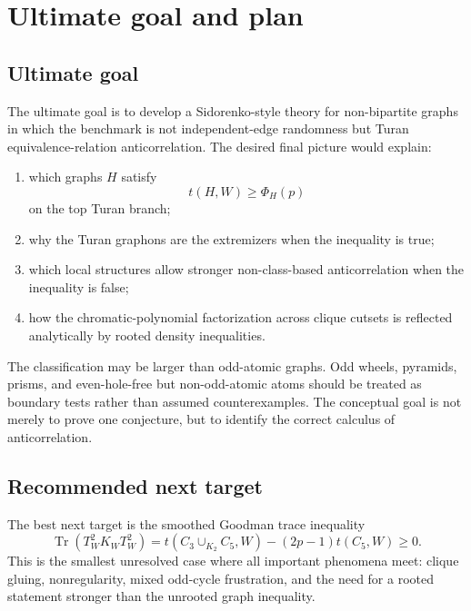\documentclass[11pt]{article}
\theoremstyle{definition}
\newcommand{\Tr}{\operatorname{Tr}}
\begin{document}
\section{Ultimate goal and plan}

\subsection{Ultimate goal}

The ultimate goal is to develop a Sidorenko-style theory for non-bipartite graphs in which the benchmark is not independent-edge randomness but Turan equivalence-relation anticorrelation.  The desired final picture would explain:
\begin{enumerate}[label=(\roman*)]
\item which graphs $H$ satisfy
\[
  t(H,W)\ge\Phi_H(p)
\]
on the top Turan branch;
\item why the Turan graphons are the extremizers when the inequality is true;
\item which local structures allow stronger non-class-based anticorrelation when the inequality is false;
\item how the chromatic-polynomial factorization across clique cutsets is reflected analytically by rooted density inequalities.
\end{enumerate}

The classification may be larger than odd-atomic graphs.  Odd wheels, pyramids, prisms, and even-hole-free but non-odd-atomic atoms should be treated as boundary tests rather than assumed counterexamples.  The conceptual goal is not merely to prove one conjecture, but to identify the correct calculus of anticorrelation.

\subsection{Recommended next target}

The best next target is the smoothed Goodman trace inequality
\begin{equation}\label{eq:next-target}
  \Tr(T_W^2K_WT_W^2)
  =t(C_3\cup_{K_2}C_5,W)-(2p-1)t(C_5,W)
  \ge0.
\end{equation}
This is the smallest unresolved case where all important phenomena meet: clique gluing, nonregularity, mixed odd-cycle frustration, and the need for a rooted statement stronger than the unrooted graph inequality.
\end{document}
